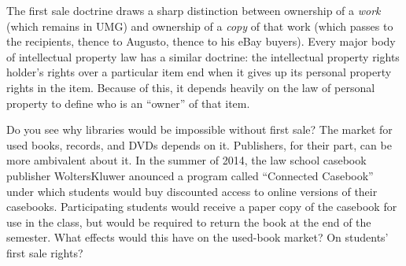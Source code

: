 \item The first sale doctrine draws a sharp distinction between ownership of a
\textit{work} (which remains in UMG) and ownership of a \textit{copy} of that
work (which passes to the recipients, thence to Augusto, thence to his eBay
buyers). Every major body of intellectual property law has a similar doctrine:
the intellectual property rights holder's rights over a particular item end
when it gives up its personal property rights in the item. Because of this, it
depends heavily on the law of personal property to define who is an ``owner''
of that item.
\item Do you see why libraries would be impossible without first sale? The
market for used books, records, and DVDs depends on it. Publishers, for their
part, can be more ambivalent about it. In the summer of 2014, the law school
casebook publisher WoltersKluwer anounced a program called ``Connected
Casebook'' under which students would buy discounted access to online versions
of their casebooks. Participating students would receive a paper copy of the
casebook for use in the class, but would be required to return the book at the
end of the semester. What effects would this have on the used-book market? On
students' first sale rights?
